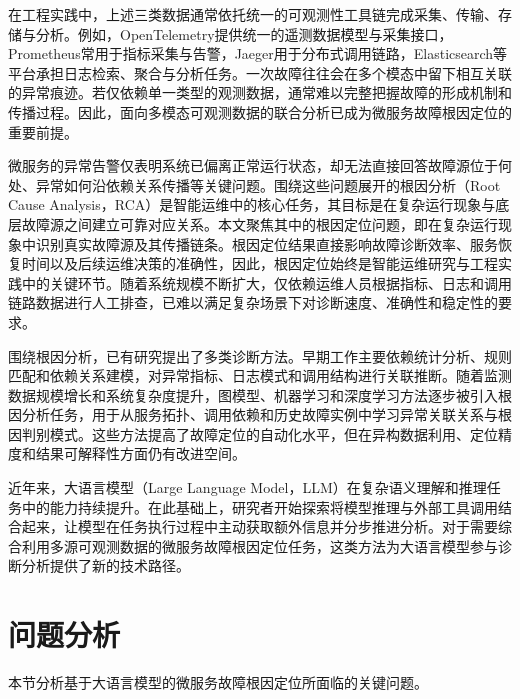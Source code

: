在工程实践中，上述三类数据通常依托统一的可观测性工具链完成采集、传输、存储与分析。例如，OpenTelemetry\cite{opentelemetry2024}提供统一的遥测数据模型与采集接口，Prometheus\cite{prometheus2024}常用于指标采集与告警，Jaeger\cite{jaeger2024}用于分布式调用链路，Elasticsearch\cite{elasticsearch2024}等平台承担日志检索、聚合与分析任务。一次故障往往会在多个模态中留下相互关联的异常痕迹。若仅依赖单一类型的观测数据，通常难以完整把握故障的形成机制和传播过程。因此，面向多模态可观测数据的联合分析已成为微服务故障根因定位的重要前提。

微服务的异常告警仅表明系统已偏离正常运行状态，却无法直接回答故障源位于何处、异常如何沿依赖关系传播等关键问题。围绕这些问题展开的根因分析（Root Cause Analysis，RCA）是智能运维中的核心任务，其目标是在复杂运行现象与底层故障源之间建立可靠对应关系\cite{microservice-diagnosis-survey}。本文聚焦其中的根因定位问题，即在复杂运行现象中识别真实故障源及其传播链条。根因定位结果直接影响故障诊断效率、服务恢复时间以及后续运维决策的准确性，因此，根因定位始终是智能运维研究与工程实践中的关键环节。随着系统规模不断扩大，仅依赖运维人员根据指标、日志和调用链路数据进行人工排查，已难以满足复杂场景下对诊断速度、准确性和稳定性的要求\cite{microservice-diagnosis-survey,bao2023aiopsstandard}。

围绕根因分析，已有研究提出了多类诊断方法。早期工作主要依赖统计分析、规则匹配和依赖关系建模，对异常指标、日志模式和调用结构进行关联推断。随着监测数据规模增长和系统复杂度提升，图模型、机器学习和深度学习方法逐步被引入根因分析任务，用于从服务拓扑、调用依赖和历史故障实例中学习异常关联关系与根因判别模式\cite{microservice-diagnosis-survey}。这些方法提高了故障定位的自动化水平，但在异构数据利用、定位精度和结果可解释性方面仍有改进空间。

近年来，大语言模型（Large Language Model，LLM）在复杂语义理解和推理任务中的能力持续提升\cite{brown2020language,wei2022chain}。在此基础上，研究者开始探索将模型推理与外部工具调用结合起来，让模型在任务执行过程中主动获取额外信息并分步推进分析\cite{yao2022react,wang2024rcagent}。对于需要综合利用多源可观测数据的微服务故障根因定位任务，这类方法为大语言模型参与诊断分析提供了新的技术路径\cite{wang2024rcagent}。


\section{问题分析}

本节分析基于大语言模型的微服务故障根因定位所面临的关键问题。

